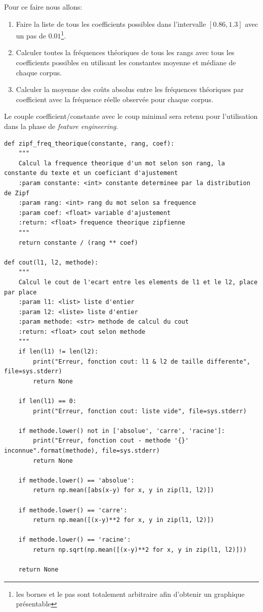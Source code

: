 			Pour ce faire nous allons:

			\begin{enumerate}
				\item Faire la liste de tous les coefficients possibles dans l'intervalle $[0.86, 1.3]$ avec un pas de $0.01$\footnote{les bornes et le pas sont totalement arbitraire afin d'obtenir un graphique présentable}.
				\item Calculer toutes la fréquences théoriques de tous les rangs avec tous les coefficients possibles en utilisant les constantes moyenne et médiane de chaque corpus.
				\item Calculer la moyenne des coûts absolus entre les fréquences théoriques par coefficient avec la fréquence réelle observée pour chaque corpus.\\
			\end{enumerate}

			Le couple coefficient/constante avec le coup minimal sera retenu pour l'utilisation dans la phase de \emph{feature engineering}. \\	

			\begin{lstlisting}[title=Fonctions utilisées dans la recherche du coefficient]
def zipf_freq_theorique(constante, rang, coef):
    """
    Calcul la frequence theorique d'un mot selon son rang, la constante du texte et un coeficiant d'ajustement
    :param constante: <int> constante determinee par la distribution de Zipf
    :param rang: <int> rang du mot selon sa frequence
    :param coef: <float> variable d'ajustement
    :return: <float> frequence theorique zipfienne
    """
    return constante / (rang ** coef)

def cout(l1, l2, methode):
    """
    Calcul le cout de l'ecart entre les elements de l1 et le l2, place par place
    :param l1: <list> liste d'entier
    :param l2: <liste> liste d'entier
    :param methode: <str> methode de calcul du cout
    :return: <float> cout selon methode
    """
    if len(l1) != len(l2):
        print("Erreur, fonction cout: l1 & l2 de taille differente", file=sys.stderr)
        return None

    if len(l1) == 0:
        print("Erreur, fonction cout: liste vide", file=sys.stderr)

    if methode.lower() not in ['absolue', 'carre', 'racine']:
        print("Erreur, fonction cout - methode '{}' inconnue".format(methode), file=sys.stderr)
        return None

    if methode.lower() == 'absolue':
        return np.mean([abs(x-y) for x, y in zip(l1, l2)])

    if methode.lower() == 'carre':
        return np.mean([(x-y)**2 for x, y in zip(l1, l2)])

    if methode.lower() == 'racine':
        return np.sqrt(np.mean([(x-y)**2 for x, y in zip(l1, l2)]))

    return None\end{lstlisting}

